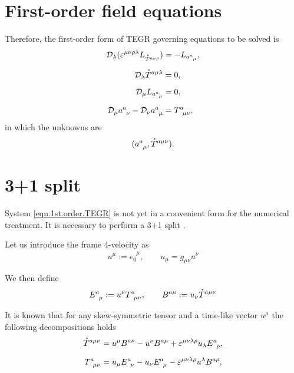 \documentclass[
10pt, %
a4paper, %
oneside, %
headinclude,footinclude, %
BCOR5mm, %
]{scrartcl}
\newcommand{\itetr}[2]{e^{\phantom{#2}#1}_{#2}}
\newcommand{\tetr}[2]{a^{#1}_{\phantom{#1}#2}}
\newcommand{\D}[1]{\mathcal{D}_{#1}} %
\newcommand{\Tors}[2]{T^{#1}_{\phantom{a}#2}}
\newcommand{\ET}[2]{E^{#1}_{\phantom{#1}#2}}	%
\newcommand{\BT}[2]{B^{#1#2}}	%
\newcommand{\Laghodge}{L}%
\newcommand{\veps}{\varepsilon}
\newcommand{\HT}[1]{\accentset{\star}{T}^{#1}}
\begin{document}
\section{First-order field equations}

Therefore, the first-order form of TEGR governing equations to be solved is
\begin{subequations}\label{eqn.1st.order.TEGR}
	\begin{align}
		\D{\lambda}(\veps^{\mu\nu\rho\lambda}\Laghodge_{\HT{a\nu\rho}}) 
		&=-\Laghodge_{\tetr{a}{\mu}},\label{eqn.1st.order.EL}\\[2mm]
		\D{\lambda}\HT{a\mu\lambda} &= 0,\label{eqn.1st.order.integr}\\[2mm]
		\D{\mu}\Laghodge_{\tetr{a}{\mu}} &= 0,\label{eqn.1st.order.enermomen}\\[2mm]
		\D{\mu}\tetr{a}{\nu} - \D{\nu}\tetr{a}{\mu} &= \Tors{a}{\mu\nu},\label{eqn.1st.order.tetrad}
	\end{align}
\end{subequations}
in which the unknowns are
\begin{equation}
(\tetr{a}{\mu},\HT{a\mu\nu}).
\end{equation}


\section{3+1 split}

System \eqref{eqn.1st.order.TEGR} is not yet in a convenient form for the numerical treatment. It 
is necessary to perform a 3+1 split \cite{Alcubierre2008}. 

Let us introduce the frame 4-velocity as
\begin{equation}\label{eqn.4velocity}
u^\mu := \itetr{\mu}{0}, \qquad u_\mu = g_{\mu\nu}u^\nu
\end{equation}

We then define 
\begin{equation}
\ET{a}{\mu} := u^\nu \Tors{a}{\mu\nu}, \qquad  \BT{a}{\mu} := u_\nu\HT{a\mu\nu}
\end{equation}

It is known that for any skew-symmetric tensor and a time-like vector $ u^\mu $ the following 
decompositions holds
\begin{subequations}\label{eqn.T.decompos}
\begin{align}
\HT{a\mu\nu} &= u^\mu \BT{a}{\nu} - u^\nu \BT{a}{\mu} + \veps^{\mu\nu\lambda\rho}u_\lambda 
\ET{a}{\rho},\\[2mm]
\Tors{a}{\mu\nu} &= u_\mu \ET{a}{\nu} - u_\nu \ET{a}{\mu} - \veps^{\mu\nu\lambda\rho}u^\lambda 
\BT{a}{\rho},
\end{align}
\end{subequations}
\end{document}

